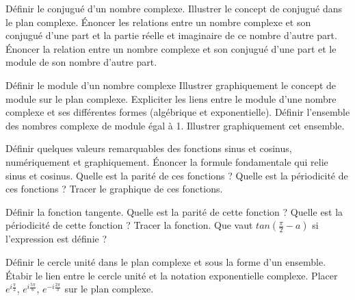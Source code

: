 \begin{exercise}[subtitle=Conjugué d'une nombre complexe, extype=cours]
	\begin{tasks} 
		\task Définir le conjugué d'un nombre complexe.
		\task Illustrer le concept de conjugué dans le plan complexe.
		\task Énoncer les relations entre un nombre complexe et son conjugué d'une part et la partie réelle et imaginaire de ce nombre d'autre part.
		\task Énoncer la relation entre un nombre complexe et son conjugué d'une part et le module de son nombre d'autre part. 
	\end{tasks}
\end{exercise}

\begin{exercise}[subtitle=Module d'un nombre complexe, extype=cours]
	\begin{tasks} 
		\task Définir le module d'un nombre complexe
		\task Illustrer graphiquement le concept de module sur le plan complexe. 
		\task Expliciter les liens entre le module d'une nombre complexe et ses différentes formes (algébrique et exponentielle).
		\task Définir l'ensemble des nombres complexe de module égal à 1. Illustrer graphiquement cet ensemble.
	\end{tasks}
\end{exercise}


\begin{exercise}[subtitle=Fonctions cosinus et sinus, extype=cours]
	\begin{tasks} 
		\task Définir quelques valeurs remarquables des fonctions sinus et cosinus, numériquement et graphiquement.
		\task Énoncer la formule fondamentale qui relie sinus et cosinus.
		\task Quelle est la parité de ces fonctions ?
		\task Quelle est la périodicité de ces fonctions ?
		\task Tracer le graphique de ces fonctions.
	\end{tasks}
\end{exercise}

\begin{exercise}[subtitle=Fonction tangente, extype=cours]
	\begin{tasks} 
		\task Définir la fonction tangente. 
		\task Quelle est la parité de cette fonction ?
		\task Quelle est la périodicité de cette fonction ?
		\task Tracer la fonction.
		\task Que vaut $tan(\frac{\pi}{2}-a)$ si l'expression est définie ?
	\end{tasks}
\end{exercise}

\begin{exercise}[subtitle=Racines nièmes, extype=cours]
	\begin{tasks} 
		\task Définir le cercle unité dans le plan complexe et sous la forme d'un ensemble.
		\task Étabir le lien entre le cercle unité et la notation exponentielle complexe.
		\task Placer $e^{i\frac{\pi}{2}}$, $e^{i\frac{5\pi}{6}}$, $e^{-i\frac{2\pi}{3}}$ sur le plan complexe.
	\end{tasks}
\end{exercise}



